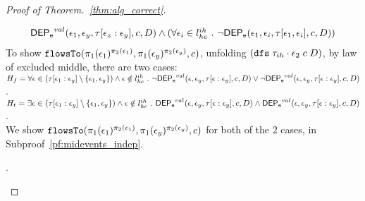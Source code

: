 \begin{proof}[Proof of Theorem.~\ref{thm:alg_correct}]
\begin{case}
\begin{subcase}
\begin{subsubcase}
\[\begin{array}{l}
  \mathsf{DEP_{\mathtt{e}}}^{val}(\mathtt{\epsilon}_1, \mathtt{\epsilon}_y, \mathtt{\tau}[\mathtt{\epsilon}_z:\mathtt{\epsilon}_y], c, D)
  \land (\forall \mathtt{\epsilon}_i \in l^{ih}_{he} ~.~ \neg \mathsf{DEP_{\mathtt{e}}}(\mathtt{\epsilon}_1, \mathtt{\epsilon}_i, \mathtt{\tau}[\mathtt{\epsilon}_1, \mathtt{\epsilon}_i], c, D))
  \end{array}
\]
%
%
To show $\mathtt{flowsTo}(\pi_1(\mathtt{\epsilon}_1)^{\pi_2(\mathtt{\epsilon}_1)}, \pi_1(\mathtt{\epsilon}_y)^{\pi_2(\mathtt{\epsilon}_y)}, c)$, 
%
unfolding $ (\mathtt{dfs} \; {\mathtt{\tau}_{ih} \cdot \mathtt{\epsilon}_2} \; c \; D)$, by law of excluded middle,   there are two cases:
\\
$H_f =  \forall \mathtt{\epsilon} \in (\mathtt{\tau}[\mathtt{\epsilon}_1:\mathtt{\epsilon}_y]\setminus \{\mathtt{\epsilon}_1, \mathtt{\epsilon}_y\}) 
 \land \mathtt{\epsilon} \notin l^{ih}_{he} ~.~
\neg \mathsf{DEP_{\mathtt{e}}}^{val} (\mathtt{\epsilon}, \mathtt{\epsilon}_y, \mathtt{\tau}[\mathtt{\epsilon}:\mathtt{\epsilon}_y], c, D) \lor \neg \mathsf{DEP_{\mathtt{e}}}^{val} (\mathtt{\epsilon}, \mathtt{\epsilon}_y, \mathtt{\tau}[\mathtt{\epsilon}:\mathtt{\epsilon}_y], c, D)$.
\\
$H_t = \exists \mathtt{\epsilon} \in (\mathtt{\tau}[\mathtt{\epsilon}_1:\mathtt{\epsilon}_y]\setminus \{\mathtt{\epsilon}_1, \mathtt{\epsilon}_y\}) 
\land \mathtt{\epsilon} \notin l^{ih}_{he} ~.~
\mathsf{DEP_{\mathtt{e}}}^{val} (\mathtt{\epsilon}, \mathtt{\epsilon}_y, \mathtt{\tau}[\mathtt{\epsilon}:\mathtt{\epsilon}_y], c, D) \land \mathsf{DEP_{\mathtt{e}}}^{val} (\mathtt{\epsilon}, \mathtt{\epsilon}_y, \mathtt{\tau}[\mathtt{\epsilon}:\mathtt{\epsilon}_y], c, D)$.
\\
We show $\mathtt{flowsTo}(\pi_1(\mathtt{\epsilon}_1)^{\pi_2(\mathtt{\epsilon}_1)}, \pi_1(\mathtt{\epsilon}_y)^{\pi_2(\mathtt{\epsilon}_y)}, c)$ for both of the 2 cases,
 in Subproof~\ref{pf:midevents_indep}.
%
\begin{subproof}.
  \label{pf:midevents_indep}
  \\

\end{subproof}
\end{subsubcase}
\end{subcase}
\end{case}
\end{proof}
